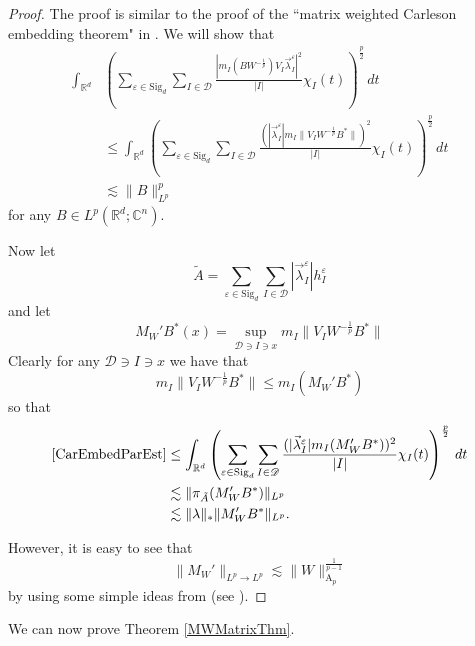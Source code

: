 \documentclass[12pt,reqno ]{amsart}
\numberwithin{equation}{section}
\theoremstyle{definition}
\newcommand{\C}{\ensuremath{\mathbb{C}^n}}
\newcommand{\Rd}{\ensuremath{\mathbb{R}^d}}
\newcommand{\D}{\ensuremath{\mathscr{D}}}
\renewcommand{\S}{\ensuremath{\text{Sig}_d}}
\begin{document}
\begin{proof}The proof is similar to the proof of the ``matrix weighted Carleson embedding theorem" in \cite{IKP}.  We  will show that   \begin{align} \int_{\Rd} & \left( \sum_{\varepsilon \in \S} \sum_{I \in \D} \frac{ | m_I(B W^{-\frac{1}{p}}) V_I \vec{\lambda}_I ^\varepsilon | ^2 }{|I|} \chi_I(t) \right)^\frac{p}{2} \, dt
\nonumber \\ & \leq \int_{\Rd}  \left( \sum_{\varepsilon \in \S} \sum_{I \in \D} \frac{ (|\vec{\lambda}_I ^\varepsilon  | m_I \|V_I W^{-\frac{1}{p}} B^* \|)^2 }{|I|} \chi_I(t) \right)^\frac{p}{2} \, dt \label{CarEmbedParEst}\\ & \lesssim \|B\|_{L^p} ^p \nonumber  \end{align} for any $B \in L^p(\Rd;\C)$.

Now let \begin{equation*} \tilde{A} = \sum_{\varepsilon \in \S} \sum_{I \in \D} |\vec{\lambda}_I ^\varepsilon  | h_I ^\varepsilon \end{equation*} and let \begin{equation*} M_W ' B^* (x) = \sup_{\D \ni I \ni x}  m_I \|V_I W^{-\frac{1}{p}} B^*\| \end{equation*} Clearly for any $\D \ni I \ni x$ we have that \begin{equation*} m_I \|V_I W^{-\frac{1}{p}} B^*\| \leq m_I ( M_W ' B^*) \end{equation*} so that \begin{align*}  \eqref{CarEmbedParEst} & \leq \int_{\Rd}  \left( \sum_{\varepsilon \in \S} \sum_{I \in \D} \frac{ (|\vec{\lambda}_I ^\varepsilon | m_I( M_W ' B^*))^2 }{|I|} \chi_I(t) \right)^\frac{p}{2} \, dt
\\ & \lesssim \|\pi_{\tilde{A}} (M_W ' B^*)\|_{L^p} \\ &  \lesssim \|\lambda\|_* \|M_W ' B^*\|_{L^p}. \end{align*}



However, it is easy to see that \begin{equation*} \|M_W ' \|_{L^p \rightarrow L^p} \lesssim \|W\|_{\text{A}_p} ^{\frac{1}{p - 1}} \end{equation*} by using some simple ideas from \cite{G} (see \cite{IKP}).   \end{proof}






We can now prove Theorem \ref{MWMatrixThm}. \\
\end{document}
